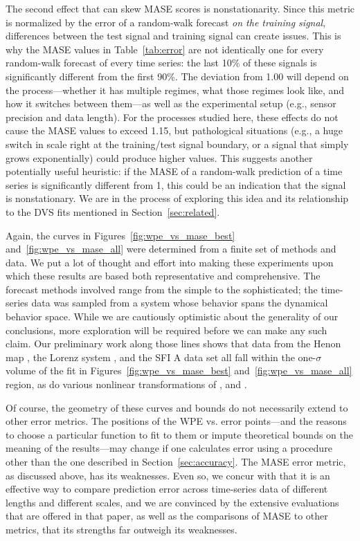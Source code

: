 
The second effect that can skew MASE scores is nonstationarity.  Since
this metric is normalized by the error of a random-walk forecast
\emph{on the training signal}, differences between the test signal and
training signal can create issues.  This is why the MASE values in
Table~\ref{tab:error} are not identically one for every random-walk
forecast of every time series: the last 10\% of these signals is
significantly different from the first 90\%.  The deviation from 1.00
will depend on the process---whether it has multiple regimes, what
those regimes look like, and how it switches between them---as well as
the experimental setup (e.g., sensor precision and data length).  For
the processes studied here, these effects do not cause the MASE values
to exceed 1.15, but pathological situations (e.g., a huge switch in
scale right at the training/test signal boundary, or a signal that
simply grows exponentially) could produce higher values.  This
suggests another potentially useful heuristic: if the MASE of a
random-walk prediction of a time series is significantly different
from 1, this could be an indication that the signal is nonstationary.
We are in the process of exploring this idea and its relationship to
the DVS fits mentioned in Section~\ref{sec:related}.

Again, the curves in Figures~\ref{fig:wpe_vs_mase_best}
and~\ref{fig:wpe_vs_mase_all} were determined from a finite set of
methods and data.  We put a lot of thought and effort into making
these experiments upon which these results are based both
representative and comprehensive.  The forecast methods involved range
from the simple to the sophisticated; the time-series data was sampled
from a system whose behavior spans the dynamical behavior space.
While we are cautiously optimistic about the generality of our
conclusions, more exploration will be required before we can make any
such claim.  Our preliminary work along those lines shows that data
from the Henon map \cite{henon}, the Lorenz system \cite{lorenz}, and
the SFI A data set \cite{weigend-book,sfi-data} all fall within the
one-$\sigma$ volume of the fit in Figures~\ref{fig:wpe_vs_mase_best}
and~\ref{fig:wpe_vs_mase_all} region, as do various nonlinear
transformations of \svdtwo, \svdfive and \svdsix.

Of course, the geometry of these curves and bounds do not necessarily
extend to other error metrics.  The positions of the WPE vs. error
points---and the reasons to choose a particular function to fit to
them or impute theoretical bounds on the meaning of the results---may
change if one calculates error using a procedure other than the one
described in Section~\ref{sec:accuracy}.  The MASE error metric, as
discussed above, has its weaknesses.  Even so, we concur with
\cite{MASE} that it is an effective way to compare prediction error
across time-series data of different lengths and different scales, and
we are convinced by the extensive evaluations that are offered in that
paper, as well as the comparisons of MASE to other metrics, that its
strengths far outweigh its weaknesses.

